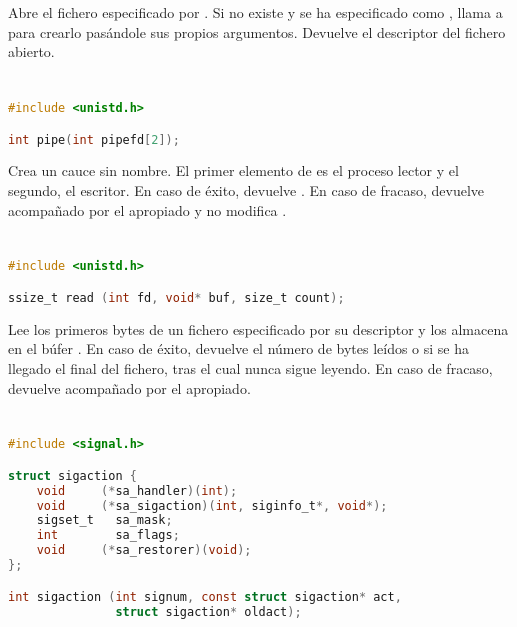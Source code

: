 Abre el fichero especificado por .
Si no existe y se ha especificado  como , llama a  para crearlo pasándole sus propios argumentos.
Devuelve el descriptor del fichero abierto.

\section{}\label{pipe}

\begin{lstlisting}[language=C]
#include <unistd.h>

int pipe(int pipefd[2]);
\end{lstlisting}

Crea un cauce sin nombre.
El primer elemento de  es el proceso lector y el segundo, el escritor.
En caso de éxito, devuelve .
En caso de fracaso, devuelve  acompañado por el  apropiado y no modifica .

\pagebreak

\section{}\label{read}

\begin{lstlisting}[language=C]
#include <unistd.h>

ssize_t read (int fd, void* buf, size_t count);
\end{lstlisting}

Lee los  primeros bytes de un fichero especificado por su descriptor  y los almacena en el búfer .
En caso de éxito, devuelve el número de bytes leídos o  si se ha llegado el final del fichero, tras el cual nunca sigue leyendo.
En caso de fracaso, devuelve  acompañado por el  apropiado.

\section{}\label{sigaction}

\begin{lstlisting}[language=C]
#include <signal.h>

struct sigaction {
	void     (*sa_handler)(int);
	void     (*sa_sigaction)(int, siginfo_t*, void*);
	sigset_t   sa_mask;
	int        sa_flags;
	void     (*sa_restorer)(void);
};

int sigaction (int signum, const struct sigaction* act,
               struct sigaction* oldact);
\end{lstlisting}

